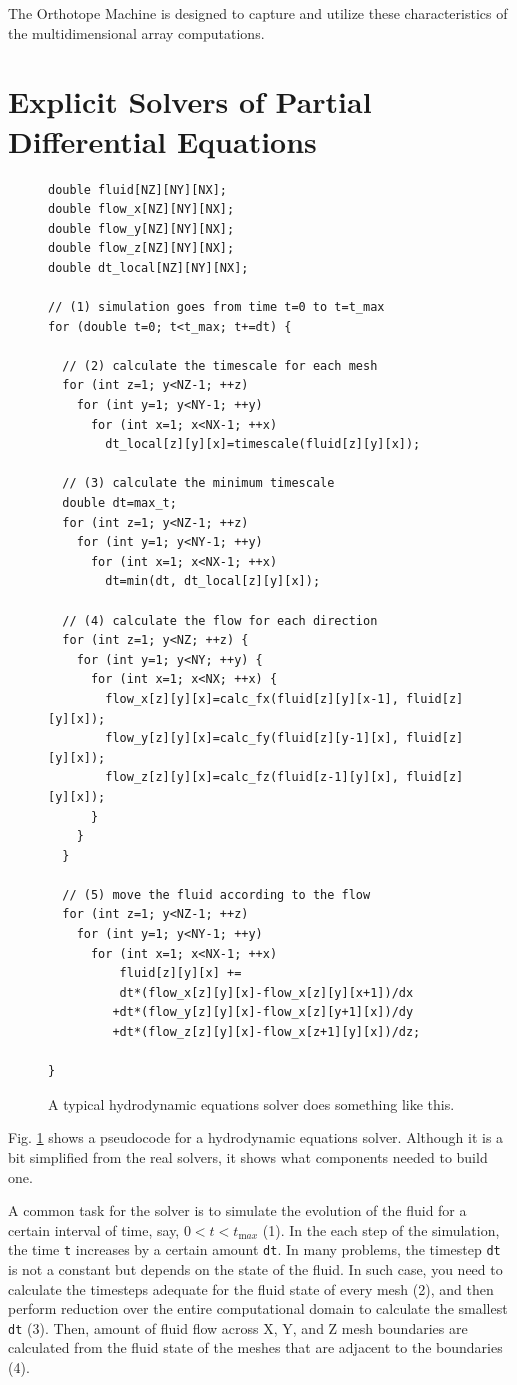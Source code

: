 \documentclass[twocolumn]{article}
\begin{document}
The Orthotope Machine is designed to capture and utilize these
characteristics of the multidimensional array computations.

\section{Explicit Solvers of Partial Differential Equations}

\begin{figure}
\begin{verbatim}
double fluid[NZ][NY][NX];
double flow_x[NZ][NY][NX];
double flow_y[NZ][NY][NX];
double flow_z[NZ][NY][NX];
double dt_local[NZ][NY][NX];

// (1) simulation goes from time t=0 to t=t_max
for (double t=0; t<t_max; t+=dt) {

  // (2) calculate the timescale for each mesh
  for (int z=1; y<NZ-1; ++z) 
    for (int y=1; y<NY-1; ++y) 
      for (int x=1; x<NX-1; ++x) 
        dt_local[z][y][x]=timescale(fluid[z][y][x]);

  // (3) calculate the minimum timescale
  double dt=max_t;
  for (int z=1; y<NZ-1; ++z) 
    for (int y=1; y<NY-1; ++y) 
      for (int x=1; x<NX-1; ++x) 
        dt=min(dt, dt_local[z][y][x]);

  // (4) calculate the flow for each direction
  for (int z=1; y<NZ; ++z) {
    for (int y=1; y<NY; ++y) { 
      for (int x=1; x<NX; ++x) { 
        flow_x[z][y][x]=calc_fx(fluid[z][y][x-1], fluid[z][y][x]);
        flow_y[z][y][x]=calc_fy(fluid[z][y-1][x], fluid[z][y][x]);
        flow_z[z][y][x]=calc_fz(fluid[z-1][y][x], fluid[z][y][x]);
      }
    }
  }

  // (5) move the fluid according to the flow
  for (int z=1; y<NZ-1; ++z) 
    for (int y=1; y<NY-1; ++y) 
      for (int x=1; x<NX-1; ++x)
          fluid[z][y][x] +=
          dt*(flow_x[z][y][x]-flow_x[z][y][x+1])/dx
         +dt*(flow_y[z][y][x]-flow_x[z][y+1][x])/dy
         +dt*(flow_z[z][y][x]-flow_x[z+1][y][x])/dz;

}
\end{verbatim}
\caption{A typical hydrodynamic equations solver does something like
  this.}\label{FigureHydroPseudoCode}
\end{figure}

Fig. \ref{FigureHydroPseudoCode} shows a pseudocode for a hydrodynamic
equations solver. Although it is a bit simplified from the real solvers, it
shows what components needed to build one.

A common task for the solver is to simulate the evolution of the fluid for a
certain interval of time, say, $0 < t < t_{\mathrm max}$ (1). In the each step
of the simulation, the time {\tt t} increases by a certain amount {\tt dt}.
In many problems, the timestep {\tt dt} is not a constant but depends on the
state of the fluid. In such case, you need to calculate the timesteps adequate
for the fluid state of every mesh (2), and then perform reduction over the
entire computational domain to calculate the smallest {\tt dt} (3). Then,
amount of fluid flow across X, Y, and Z mesh boundaries are calculated from
the fluid state of the meshes that are adjacent to the boundaries (4). 
\end{document}
